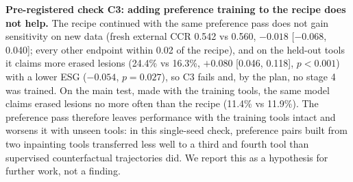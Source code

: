 \documentclass[11pt]{article}
\begin{document}
\textbf{Pre-registered check C3: adding preference training to the recipe does not help.} The recipe continued with the same preference pass does not gain sensitivity on new data (fresh external CCR 0.542 vs 0.560, $-0.018$ [$-0.068$, 0.040]; every other endpoint within 0.02 of the recipe), and on the held-out tools it claims more erased lesions (24.4\% vs 16.3\%, $+0.080$ [0.046, 0.118], $p<0.001$) with a lower ESG ($-0.054$, $p=0.027$), so C3 fails and, by the plan, no stage 4 was trained. On the main test, made with the training tools, the same model claims erased lesions no more often than the recipe (11.4\% vs 11.9\%). The preference pass therefore leaves performance with the training tools intact and worsens it with unseen tools: in this single-seed check, preference pairs built from two inpainting tools transferred less well to a third and fourth tool than supervised counterfactual trajectories did. We report this as a hypothesis for further work, not a finding.
\end{document}
